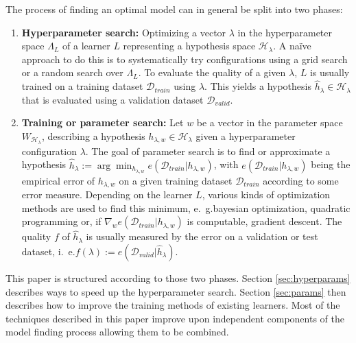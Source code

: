 The process of finding an optimal model can in general be split into two phases:
\begin{enumerate}
	\item \textbf{Hyperparameter search:}
		Optimizing a vector \(\lambda\) in the hyperparameter space \(\Lambda_L\) of a learner \(L\) representing a hypothesis space \(\mathcal{H}_{\lambda}\).
		A na\"ive approach to do this is to systematically try configurations using a grid search or a random search over \(\Lambda_L\).
		To evaluate the quality of a given \(\lambda\), \(L\) is usually trained on a training dataset \(\mathcal{D}_{\mathit{train}}\) using \(\lambda\). This yields a hypothesis \(\hat{h}_\lambda \in \mathcal{H}_{\lambda}\) that is evaluated using a validation dataset \(\mathcal{D}_{\mathit{valid}}\).
	\item \textbf{Training or parameter search:}
		Let \(w\) be a vector in the parameter space \(W_{\mathcal{H}_\lambda}\), describing a hypothesis \(h_{\lambda, w} \in \mathcal{H}_\lambda\) given a hyperparameter configuration \(\lambda\).
		The goal of parameter search is to find or approximate a hypothesis \(\hat{h}_\lambda := \arg\min_{h_{\lambda, w}}{e(\mathcal{D}_{\mathit{train}} | h_{\lambda, w})}\), with \(e(\mathcal{D}_{\mathit{train}} | h_{\lambda, w})\) being the empirical error of \(h_{\lambda, w}\) on a given training dataset \(\mathcal{D}_{\mathit{train}}\) according to some error measure.
		Depending on the learner \(L\), various kinds of optimization methods are used to find this minimum, e.~g.\@ bayesian optimization, quadratic programming or, if \(\nabla_w e(\mathcal{D}_{\mathit{train}} | h_{\lambda, w})\) is computable, gradient descent.
		The quality \(f\) of \(\hat{h}_\lambda\) is usually measured by the error on a validation or test dataset, i.~e.\@ \(f(\lambda) := e(\mathcal{D}_{\mathit{valid}} | \hat{h}_\lambda)\).
\end{enumerate}
This paper is structured according to those two phases.
Section \ref{sec:hyperparams} describes ways to speed up the hyperparameter search.
Section \ref{sec:params} then describes how to improve the training methods of existing learners.
Most of the techniques described in this paper improve upon independent components of the model finding process allowing them to be combined.

